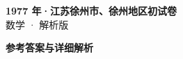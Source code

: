 \documentclass[zihao=-4, a4paper]{ctexart}
\begin{document}
\begin{center}
  {\Large\bfseries 1977 年·江苏徐州市、徐州地区初试卷}\\[4pt]
  {\large 数学 · 解析版}
\end{center}
\medskip
{}

\clearpage
{}
\begin{center}{\Large\bfseries 参考答案与详细解析}\end{center}
\medskip

\end{document}

